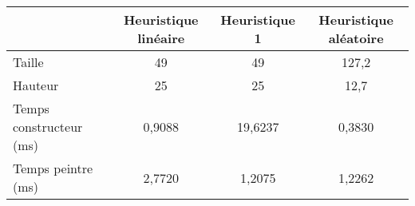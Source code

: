 \begin{center}
{\tabulinesep=1.2mm
\begin{tabu}{|l|c|c|c|}
  \hline
  & Heuristique linéaire  & Heuristique 1 & Heuristique aléatoire \\ 
  \hline
  Taille &        49&        49&     127,2  \\ 
  \hline
  Hauteur &        25&        25&      12,7  \\ 
  \hline
  Temps constructeur (ms) &          0,9088&         19,6237&          0,3830  \\ 
  \hline
  Temps peintre (ms) &            2,7720&           1,2075&           1,2262  \\ 
  \hline
\end{tabu}
}
\end{center}

